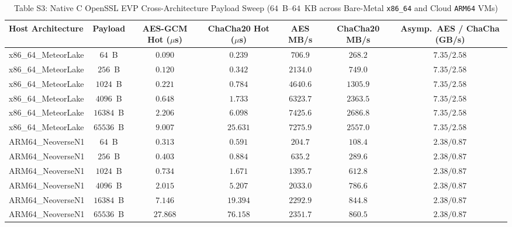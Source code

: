 \documentclass[10pt,journal,compsoc]{IEEEtran}
\begin{document}
\begin{table}[!t]
\centering
\caption{Table S3: Native C OpenSSL EVP Cross-Architecture Payload Sweep ($64$~B--$64$~KB across Bare-Metal \texttt{x86\_64} and Cloud \texttt{ARM64} VMs)}
\setlength{\tabcolsep}{4.2pt}
\renewcommand{\arraystretch}{1.04}
\begin{adjustbox}{max width=\textwidth}
\begin{tabular}{@{}lcccccc@{}}
\toprule
\textbf{Host Architecture} & \textbf{Payload} & \textbf{AES-GCM Hot ($\mu$s)} & \textbf{ChaCha20 Hot ($\mu$s)} & \textbf{AES MB/s} & \textbf{ChaCha20 MB/s} & \textbf{Asymp.\ AES / ChaCha (GB/s)} \\
\midrule
x86\_64\_MeteorLake & $64$~B & $0.090$ & $0.239$ & $706.9$ & $268.2$ & $7.35 / 2.58$ \\
x86\_64\_MeteorLake & $256$~B & $0.120$ & $0.342$ & $2134.0$ & $749.0$ & $7.35 / 2.58$ \\
x86\_64\_MeteorLake & $1024$~B & $0.221$ & $0.784$ & $4640.6$ & $1305.9$ & $7.35 / 2.58$ \\
x86\_64\_MeteorLake & $4096$~B & $0.648$ & $1.733$ & $6323.7$ & $2363.5$ & $7.35 / 2.58$ \\
x86\_64\_MeteorLake & $16384$~B & $2.206$ & $6.098$ & $7425.6$ & $2686.8$ & $7.35 / 2.58$ \\
x86\_64\_MeteorLake & $65536$~B & $9.007$ & $25.631$ & $7275.9$ & $2557.0$ & $7.35 / 2.58$ \\
ARM64\_NeoverseN1 & $64$~B & $0.313$ & $0.591$ & $204.7$ & $108.4$ & $2.38 / 0.87$ \\
ARM64\_NeoverseN1 & $256$~B & $0.403$ & $0.884$ & $635.2$ & $289.6$ & $2.38 / 0.87$ \\
ARM64\_NeoverseN1 & $1024$~B & $0.734$ & $1.671$ & $1395.7$ & $612.8$ & $2.38 / 0.87$ \\
ARM64\_NeoverseN1 & $4096$~B & $2.015$ & $5.207$ & $2033.0$ & $786.6$ & $2.38 / 0.87$ \\
ARM64\_NeoverseN1 & $16384$~B & $7.146$ & $19.394$ & $2292.9$ & $844.8$ & $2.38 / 0.87$ \\
ARM64\_NeoverseN1 & $65536$~B & $27.868$ & $76.158$ & $2351.7$ & $860.5$ & $2.38 / 0.87$ \\
\bottomrule
\end{tabular}
\end{adjustbox}
\end{table}
\end{document}
